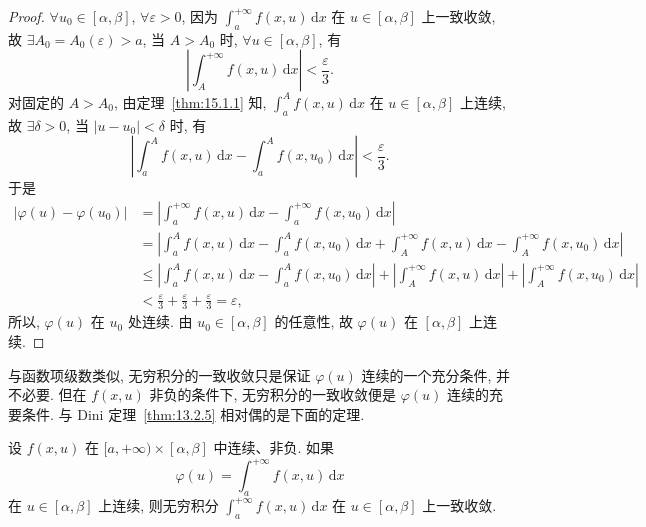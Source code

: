 \begin{proof}
$\forall u_{0}\in[\alpha,\beta]$, $\forall\varepsilon>0$, 因为 $\displaystyle\int_{a}^{+\infty}f(x,u)\,\mathrm{d}x$ 在 $u\in[\alpha,\beta]$ 上一致收敛, 故 $\exists A_{0}=A_{0}(\varepsilon)>a$, 当 $A>A_{0}$ 时, $\forall u\in[\alpha,\beta]$, 有
\[
  \left|\int_{A}^{+\infty}f(x,u)\,\mathrm{d}x\right|<\frac{\varepsilon}{3}.
\]
对固定的 $A>A_{0}$, 由定理~\ref{thm:15.1.1} 知, $\displaystyle\int_{a}^{A}f(x,u)\,\mathrm{d}x$ 在 $u\in[\alpha,\beta]$ 上连续, 故 $\exists\delta>0$, 当 $|u-u_{0}|<\delta$ 时, 有
\[
  \left|\int_{a}^{A}f(x,u)\,\mathrm{d}x-\int_{a}^{A}f(x,u_{0})\,\mathrm{d}x\right|<\frac{\varepsilon}{3}.
\]
于是
\[
  \begin{aligned}
    |\varphi(u)-\varphi(u_{0})|&=\left|\int_{a}^{+\infty}f(x,u)\,\mathrm{d}x-\int_{a}^{+\infty}f(x,u_{0})\,\mathrm{d}x\right|\\
    &=\left|\int_{a}^{A}f(x,u)\,\mathrm{d}x-\int_{a}^{A}f(x,u_{0})\,\mathrm{d}x+\int_{A}^{+\infty}f(x,u)\,\mathrm{d}x-\int_{A}^{+\infty}f(x,u_{0})\,\mathrm{d}x\right|\\
    &\leqslant\left|\int_{a}^{A}f(x,u)\,\mathrm{d}x-\int_{a}^{A}f(x,u_{0})\,\mathrm{d}x\right|+\left|\int_{A}^{+\infty}f(x,u)\,\mathrm{d}x\right|+\left|\int_{A}^{+\infty}f(x,u_{0})\,\mathrm{d}x\right|\\
    &<\frac{\varepsilon}{3}+\frac{\varepsilon}{3}+\frac{\varepsilon}{3}=\varepsilon,
  \end{aligned}
\]
所以, $\varphi(u)$ 在 $u_{0}$ 处连续. 由 $u_{0}\in[\alpha,\beta]$ 的任意性, 故 $\varphi(u)$ 在 $[\alpha,\beta]$ 上连续.
\end{proof}

与函数项级数类似, 无穷积分的一致收敛只是保证 $\varphi(u)$ 连续的一个充分条件, 并不必要. 但在 $f(x,u)$ 非负的条件下, 无穷积分的一致收敛便是 $\varphi(u)$ 连续的充要条件. 与 Dini 定理~\ref{thm:13.2.5} 相对偶的是下面的定理.

\begin{theorem}[Dini]\label{thm:15.3.2}
设 $f(x,u)$ 在 $[a,+\infty)\times[\alpha,\beta]$ 中连续、非负. 如果
\[
  \varphi(u)=\int_{a}^{+\infty}f(x,u)\,\mathrm{d}x
\]
在 $u\in[\alpha,\beta]$ 上连续, 则无穷积分 $\displaystyle\int_{a}^{+\infty}f(x,u)\,\mathrm{d}x$ 在 $u\in[\alpha,\beta]$ 上一致收敛.
\end{theorem}

